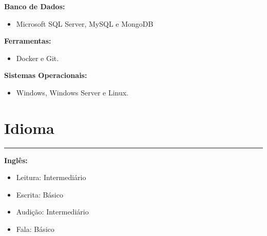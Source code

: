 \documentclass[10pt]{article}
\begin{document}
{\bf Banco de Dados:}
\begin{itemize} \itemsep -2pt
    \item Microsoft SQL Server, MySQL e MongoDB
\end{itemize}

{\bf Ferramentas:}
\begin{itemize} \itemsep -2pt
    \item Docker e Git.
\end{itemize}

{\bf Sistemas Operacionais:}
\begin{itemize} \itemsep -2pt
    \item Windows, Windows Server e Linux.
\end{itemize}


\section*{Idioma}
\vspace{-15pt}
\rule{\linewidth}{1pt}

{\bf Inglês:}
\begin{itemize} \itemsep -2pt
    \item Leitura: Intermediário
    \item Escrita: Básico
    \item Audição: Intermediário
    \item Fala: Básico
\end{itemize}

\end{document}
